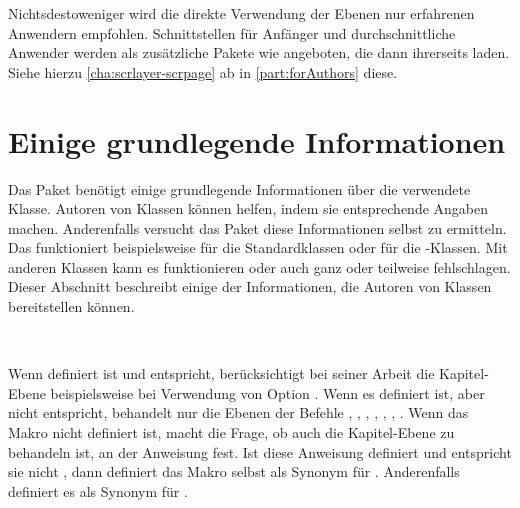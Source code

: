 Nichtsdestoweniger wird die direkte Verwendung der Ebenen nur erfahrenen
Anwendern empfohlen. Schnittstellen für Anfänger und durchschnittliche
Anwender werden als zusätzliche Pakete wie
\hyperref[cha:scrlayer-scrpage]{} angeboten, die
dann ihrerseits  laden. Siehe hierzu
\autoref{cha:scrlayer-scrpage} ab  in
\autoref{part:forAuthors} diese.




\section{Einige grundlegende Informationen}

Das Paket benötigt einige grundlegende Informationen über die
verwendete Klasse. Autoren von Klassen können  helfen, indem
sie entsprechende Angaben machen. Anderenfalls versucht das Paket diese
Informationen selbst zu ermitteln. Das funktioniert beispielsweise für die
Standardklassen oder für die \KOMAScript-Klassen. Mit anderen Klassen kann es
funktionieren oder auch ganz oder teilweise fehlschlagen.
%
Dieser Abschnitt beschreibt einige der Informationen, die Autoren von Klassen
bereitstellen können.

\begin{Declaration}
  \ \ %
  \ \ 
\end{Declaration}
Wenn  definiert ist und 
entspricht, berücksichtigt  bei seiner Arbeit die
Kapitel-Ebene beispielsweise bei Verwendung von Option
. Wenn es definiert ist, aber nicht
 entspricht, behandelt  nur die Ebenen der
Befehle , ,
, ,
, ,
. Wenn das Makro nicht definiert ist, macht
 die Frage, ob auch die Kapitel-Ebene zu behandeln ist, an
der Anweisung  fest. Ist diese Anweisung
definiert und entspricht sie nicht , dann definiert
 das Makro  selbst als Synonym für
. Anderenfalls definiert es  als Synonym für
.%
%
\EndIndexGroup


